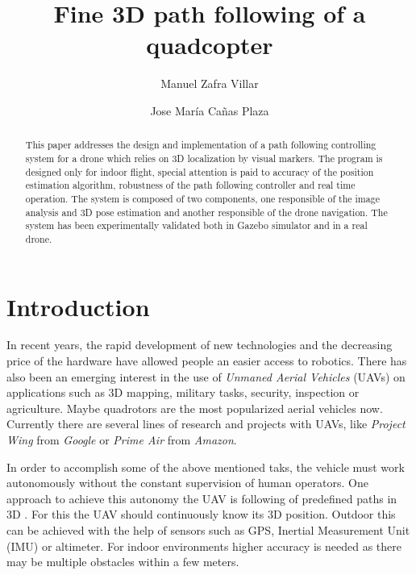 \documentclass{styles/svproc}
\begin{document}
\title{Fine 3D path following of a quadcopter}
\author{Manuel Zafra Villar \and Jose María Cañas Plaza}
\maketitle

\begin{abstract}
This paper addresses the design and implementation of a path following controlling system for a drone which relies on 3D localization by visual markers. The program is designed only for indoor flight, special attention is paid to accuracy of the position estimation algorithm, robustness of the path following controller and real time operation. The system is composed of two components, one responsible of the image analysis and 3D pose estimation and another responsible of the drone navigation. The system has been experimentally validated both in Gazebo simulator and in a real drone. 
\end{abstract}

\section{Introduction}

	In recent years, the rapid development of new technologies and the decreasing price of the hardware have allowed people an easier access to robotics. There has also been an emerging interest in the use of \textit{Unmaned Aerial Vehicles} (UAVs) on applications such as 3D mapping, military tasks, security, inspection \cite{nikolic2014} or agriculture. Maybe quadrotors are the most popularized aerial vehicles now. Currently there are several lines of research and projects with UAVs, like \textit{Project Wing} from \textit{Google} or \textit{Prime Air} from \textit{Amazon}. 

	In order to accomplish some of the above mentioned taks, the vehicle must work autonomously without the constant supervision of human operators. One approach to achieve this autonomy the UAV is following of predefined paths in 3D \cite{dandrea2015,beul2015}. For this the UAV should continuously know its 3D position. Outdoor this can be achieved with the help of sensors such as GPS, Inertial Measurement Unit (IMU) or altimeter. For indoor environments higher accuracy is needed as there may be multiple obstacles within a few meters. 
	
\end{document}
